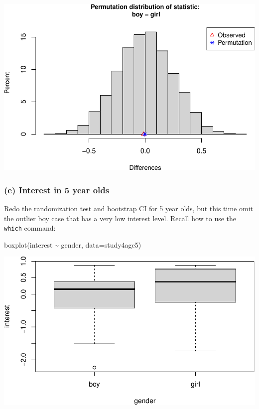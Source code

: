 \documentclass[
]{book}
\newenvironment{Shaded}{\begin{snugshade}}{\end{snugshade}}
\newcommand{\AttributeTok}[1]{\textcolor[rgb]{0.77,0.63,0.00}{#1}}
\newcommand{\FunctionTok}[1]{\textcolor[rgb]{0.00,0.00,0.00}{#1}}
\newcommand{\NormalTok}[1]{#1}
\newcommand{\SpecialCharTok}[1]{\textcolor[rgb]{0.00,0.00,0.00}{#1}}
\begin{document}
\includegraphics[width=1\linewidth]{Class_Activity_14_files/figure-latex/unnamed-chunk-11-1}

\vspace*{1in}

\hypertarget{e-interest-in-5-year-olds}{%
\subsubsection{(e) Interest in 5 year olds}\label{e-interest-in-5-year-olds}}

Redo the randomization test and bootstrap CI for 5 year olds, but this time omit the outlier boy case that has a very low interest level. Recall how to use the \texttt{which} command:

\begin{Shaded}
\begin{Highlighting}[]
\FunctionTok{boxplot}\NormalTok{(interest }\SpecialCharTok{\textasciitilde{}}\NormalTok{ gender, }\AttributeTok{data=}\NormalTok{study4age5)}
\end{Highlighting}
\end{Shaded}

\includegraphics[width=1\linewidth]{Class_Activity_14_files/figure-latex/unnamed-chunk-12-1}
\end{document}
